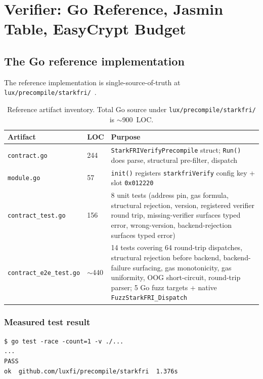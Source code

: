 \section{Verifier: Go Reference, Jasmin Table, EasyCrypt Budget}
\label{sec:verifier}

\subsection{The Go reference implementation}

The reference implementation is single-source-of-truth at
\texttt{lux/precompile/starkfri/}~\cite{starkfrirepo}.

\begin{table}[h]
\centering
\small
\begin{tabular}{@{}p{4.5cm}p{2cm}p{6.5cm}@{}}
\toprule
\textbf{Artifact} & \textbf{LOC} & \textbf{Purpose} \\
\midrule
\texttt{contract.go}         & 244 & \texttt{StarkFRIVerifyPrecompile} struct; \texttt{Run()} does parse, structural pre-filter, dispatch \\
\texttt{module.go}           & 57  & \texttt{init()} registers \texttt{starkfriVerify} config key + slot \texttt{0x012220} \\
\texttt{contract\_test.go}   & 156 & 8 unit tests (address pin, gas formula, structural rejection, version, registered verifier round trip, missing-verifier surfaces typed error, wrong-version, backend-rejection surfaces typed error) \\
\texttt{contract\_e2e\_test.go} & $\sim$440 & 14 tests covering 64 round-trip dispatches, structural rejection before backend, backend-failure surfacing, gas monotonicity, gas uniformity, OOG short-circuit, round-trip parser; 5 Go fuzz targets + native \texttt{FuzzStarkFRI\_Dispatch} \\
\bottomrule
\end{tabular}
\caption{Reference artifact inventory. Total Go source under
\texttt{lux/precompile/starkfri/} is $\sim$\SI{900}{LOC}.}
\label{tab:go-artifacts}
\end{table}

\subsubsection{Measured test result}

\begin{lstlisting}[language={}]
$ go test -race -count=1 -v ./...
...
PASS
ok  github.com/luxfi/precompile/starkfri  1.376s
\end{lstlisting}

